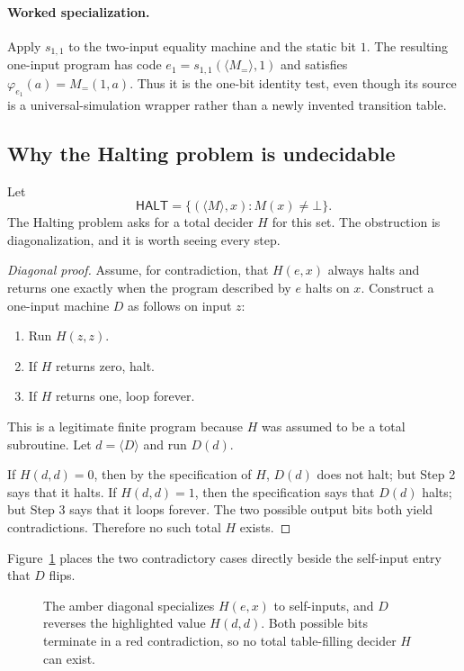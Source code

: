 \paragraph{Worked specialization.}
Apply \(s_{1,1}\) to the two-input equality machine and the static bit \(1\).
The resulting one-input program has code
\(e_1=s_{1,1}(\langle M_=\rangle,1)\) and satisfies
\(\varphi_{e_1}(a)=M_=(1,a)\).  Thus it is the one-bit identity test, even
though its source is a universal-simulation wrapper rather than a newly
invented transition table.

\subsection{Why the Halting problem is undecidable}

Let
\[
 \mathsf{HALT}=\{(\langle M\rangle,x):M(x)\neq\bot\}.
\]
The Halting problem asks for a total decider \(H\) for this set.  The obstruction
is diagonalization, and it is worth seeing every step.

\begin{proof}[Diagonal proof]
Assume, for contradiction, that \(H(e,x)\) always halts and returns one exactly
when the program described by \(e\) halts on \(x\).  Construct a one-input
machine \(D\) as follows on input \(z\):
\begin{enumerate}
\item Run \(H(z,z)\).
\item If \(H\) returns zero, halt.
\item If \(H\) returns one, loop forever.
\end{enumerate}
This is a legitimate finite program because \(H\) was assumed to be a total
subroutine.  Let \(d=\langle D\rangle\) and run \(D(d)\).

If \(H(d,d)=0\), then by the specification of \(H\), \(D(d)\) does not halt;
but Step 2 says that it halts.  If \(H(d,d)=1\), then the specification says
that \(D(d)\) halts; but Step 3 says that it loops forever.  The two possible
output bits both yield contradictions.  Therefore no such total \(H\) exists.
\end{proof}

Figure~\ref{fig:diagonal} places the two contradictory cases directly beside
the self-input entry that \(D\) flips.

\begin{figure}[t]
\centering

\caption{The amber diagonal specializes \(H(e,x)\) to self-inputs, and \(D\) reverses the highlighted value \(H(d,d)\).  Both possible bits terminate in a red contradiction, so no total table-filling decider \(H\) can exist.}
\label{fig:diagonal}
\end{figure}

